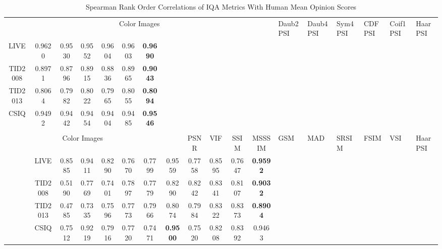 \documentclass[11pt,a4paper]{article}
\begin{document}
\FloatBarrier
\setlength{\tabcolsep}{1mm}
\begin{table}[!htb]
	\centering
	\caption{Spearman Rank Order Correlations of IQA Metrics With Human Mean Opinion Scores}
	\label{tab:details}
	\begin{scriptsize}
		\begin{threeparttable}
			\begin{tabular}{*{12}{c}}
				\toprule[0.5mm]
				\multicolumn{12}{c}{Color Images}\0.1cm]
  & Daub2PSI & Daub4PSI & Sym4PSI & CDFPSI & Coif1PSI & HaarPSI\\
 LIVE & \cellcolor{green!25}0.9620 & \cellcolor{green!25}0.9530 & \cellcolor{green!25}0.9552 & \cellcolor{green!25}0.9604 & \cellcolor{green!25}0.9603 & \textbf{0.9690}\\
 TID2008 & 0.8971 & \cellcolor{green!25}0.8796 & 0.8915 & \cellcolor{green!25}0.8836 & 0.8965 & \textbf{0.9043}\\
 TID2013 & 0.8064 & 0.7982 & 0.8022 & 0.7965 & 0.8055 & \textbf{0.8094}\\
 CSIQ & 0.9492 & \cellcolor{green!25}0.9442 & 0.9454 & \cellcolor{green!25}0.9404 & 0.9485 & \textbf{0.9546}\\
\\
\multicolumn{7}{c}{Color Images}\0.1cm]
 & & PSNR & VIF & SSIM & MSSSIM & GSM & MAD & SRSIM & FSIM & VSI & HaarPSI\\
& LIVE & \cellcolor{green!25}0.8585 & \cellcolor{green!25}0.9411 & \cellcolor{green!25}0.8290 & \cellcolor{green!25}0.7670 & \cellcolor{green!25}0.7799 & 0.9559 & \cellcolor{green!25}0.7758 & \cellcolor{green!25}0.8595 & \cellcolor{green!25}0.7647 & \textbf{0.9592}\\
& TID2008 & \cellcolor{green!25}0.5190 & \cellcolor{green!25}0.7769 & \cellcolor{green!25}0.7401 & \cellcolor{green!25}0.7897 & \cellcolor{green!25}0.7779 & \cellcolor{green!25}0.8290 & \cellcolor{green!25}0.8242 & \cellcolor{green!25}0.8341 & \cellcolor{green!25}0.8107 & \textbf{0.9032}\\
& TID2013 & \cellcolor{green!25}0.4785 & \cellcolor{green!25}0.7335 & \cellcolor{green!25}0.7596 & \cellcolor{green!25}0.7773 & \cellcolor{green!25}0.7966 & \cellcolor{green!25}0.8074 & \cellcolor{green!25}0.7984 & \cellcolor{green!25}0.8322 & \cellcolor{green!25}0.8373 & \textbf{0.8904}\\
& CSIQ & \cellcolor{green!25}0.7512 & \cellcolor{green!25}0.9219 & \cellcolor{green!25}0.7916 & \cellcolor{green!25}0.7720 & \cellcolor{green!25}0.7471 & \textbf{0.9500} & \cellcolor{green!25}0.7520 & \cellcolor{green!25}0.8208 & \cellcolor{green!25}0.8392 & 0.9463\\

\end{tabular}
\end{threeparttable}
\end{scriptsize}
\end{table}
\end{document}
